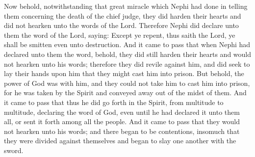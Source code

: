 \bverse \iffalse Now behold, notwithstanding that great miracle which Nephi had done in telling them concerning the death of the chief judge, they did harden their hearts and did not hearken unto the words of the Lord. \fi
Now behold, notwithstanding that great miracle which Nephi had done in telling them concerning the death of the chief judge, they did harden their hearts and did not hearken unto the words of the Lord.
\bverse \iffalse Therefore Nephi did declare unto them the word of the Lord, saying: Except ye repent, thus saith the Lord, ye shall be smitten even unto destruction. \fi
Therefore Nephi did declare unto them the word of the Lord, saying: Except ye repent, thus saith the Lord, ye shall be smitten even unto destruction.
\bverse \iffalse And it came to pass that when Nephi had declared unto them the word, behold, they did still harden their hearts and would not hearken unto his words; therefore they did revile against him, and did seek to lay their hands upon him that they might cast him into prison. \fi
And it came to pass that when Nephi had declared unto them the word, behold, they did still harden their hearts and would not hearken unto his words; therefore they did revile against him, and did seek to lay their hands upon him that they might cast him into prison.
\bverse \iffalse But behold, the power of God was with him, and they could not take him to cast him into prison, for he was taken by the Spirit and conveyed away out of the midst of them. \fi
But behold, the power of God was with him, and they could not take him to cast him into prison, for he was taken by the Spirit and conveyed away out of the midst of them.
\bverse \iffalse And it came to pass that thus he did go forth in the Spirit, from multitude to multitude, declaring the word of God, even until he had declared it unto them all, or sent it forth among all the people. \fi
And it came to pass that thus he did go forth in the Spirit, from multitude to multitude, declaring the word of God, even until he had declared it unto them all, or sent it forth among all the people.
\bverse \iffalse And it came to pass that they would not hearken unto his words; and there began to be contentions, insomuch that they were divided against themselves and began to slay one another with the sword. \fi
And it came to pass that they would not hearken unto his words; and there began to be contentions, insomuch that they were divided against themselves and began to slay one another with the sword.
